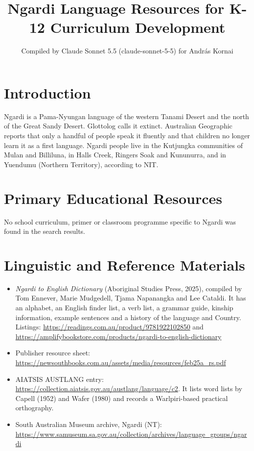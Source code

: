 \documentclass[12pt]{article}
\title{Ngardi Language Resources for K-12 Curriculum Development}
\author{Compiled by Claude Sonnet 5.5 (claude-sonnet-5-5) for Andr\'as Kornai}
\date{}
\begin{document}
\maketitle

\section{Introduction}
Ngardi is a Pama-Nyungan language of the western Tanami Desert and the north of the Great Sandy Desert. Glottolog calls it extinct. Australian Geographic reports that only a handful of people speak it fluently and that children no longer learn it as a first language. Ngardi people live in the Kutjungka communities of Mulan and Billiluna, in Halls Creek, Ringers Soak and Kununurra, and in Yuendumu (Northern Territory), according to NIT.

\section{Primary Educational Resources}
No school curriculum, primer or classroom programme specific to Ngardi was found in the search results.

\section{Linguistic and Reference Materials}
\begin{itemize}
\item \emph{Ngardi to English Dictionary} (Aboriginal Studies Press, 2025), compiled by Tom Ennever, Marie Mudgedell, Tjama Napanangka and Lee Cataldi. It has an alphabet, an English finder list, a verb list, a grammar guide, kinship information, example sentences and a history of the language and Country. Listings: \url{https://readings.com.au/product/9781922102850} and \url{https://amplifybookstore.com/products/ngardi-to-english-dictionary}
\item Publisher resource sheet: \url{https://newsouthbooks.com.au/assets/media/resources/feb25a_rs.pdf}
\item AIATSIS AUSTLANG entry: \url{https://collection.aiatsis.gov.au/austlang/language/c2}. It lists word lists by Capell (1952) and Wafer (1980) and records a Warlpiri-based practical orthography.
\item South Australian Museum archive, Ngardi (NT): \url{https://www.samuseum.sa.gov.au/collection/archives/language_groups/ngardi}
\end{itemize}
\end{document}
